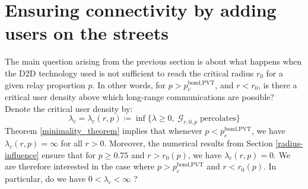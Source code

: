 \documentclass[conference]{IEEEtran}
\begin{document}

\section{Ensuring connectivity by adding users on the streets}
The main question arising from the previous section is about what happens when the D2D technology used is not sufficient to reach the critical radius $r_{0}$ for a given relay proportion $p$. In other words, for $p > p_{c}^{\text{bond,PVT}}$, and $r < r_{0}$, is there a critical user density above which long-range communications are possible?\\
Denote the critical user density by:
\begin{equation}
\label{critical-lambda}
\lambda_{c} = \lambda_{c}(r,p) \coloneqq \inf \lbrace \lambda \geq 0, \; \mathcal{G}_{r,0,p} \; \text{percolates} \rbrace  
\end{equation}
Theorem \ref{minimality_theorem} implies that whenever $p < p_{c}^{\text{bond,PVT}}$, we have $\lambda_{c}(r,p)= \infty$ for all $r > 0$. Moreover, the numerical results from Section \ref{radius-influence} ensure that for $p \geq 0.75$ and $r > r_{0}(p)$, we have $\lambda_{c}(r,p)=0$. We are therefore interested in the case where $p > p_{c}^{\text{bond,PVT}}$ and $r < r_{0}(p)$. In particular, do we have $0 < \lambda_{c} < \infty$ ? 
\end{document}
